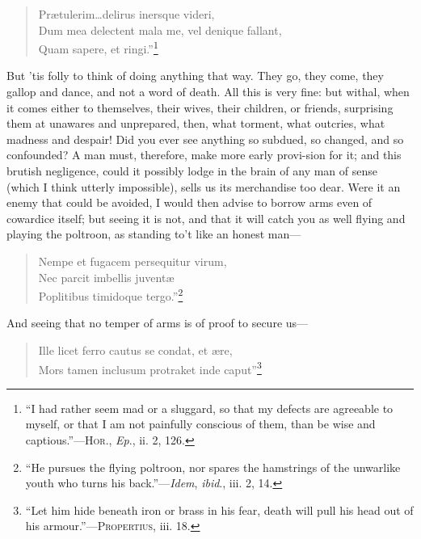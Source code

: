 \begin{verse}
Pr\ae tulerim\ldots delirus inersque videri,\\
Dum mea delectent mala me, vel denique fallant,\\
Quam sapere, et ringi.''\footnote{``I had rather seem mad or a sluggard,
so that my defects are agreeable to myself, or that I am not painfully
conscious of them, than be wise and captious.''---\textsc{Hor}.,
\textit{Ep}., ii. 2, 126.}
\end{verse}

\noindent But 'tis folly to think of doing anything that way. They go,
they come, they gallop and dance, and not a word of death. All this is
very fine: but withal, when it comes either to themselves, their
wives, their children, or friends, surprising them at unawares and
unprepared, then, what torment, what outcries, what madness and
despair! Did you ever see anything so subdued, so changed, and so
confounded? A man must, therefore, make more early provi-sion
for it; and this brutish negligence, could it possibly lodge in the
brain of any man of sense (which I think utterly impossible), sells us
its merchandise too dear. Were it an enemy that could be avoided, I
would then advise to borrow arms even of cowardice itself; but seeing
it is not, and that it will catch you as well flying and playing the
poltroon, as standing to't like an honest man---

\begin{verse}
Nempe et fugacem persequitur virum,\\
Nec parcit imbellis juvent\ae\\
\vin Poplitibus timidoque tergo.''\footnote{``He pursues the flying
poltroon, nor spares the hamstrings of the unwarlike youth who turns
his back.''---\textit{Idem}, \textit{ibid}., iii. 2, 14.}
\end{verse}

And seeing that no temper of arms is of proof to secure us---

\begin{verse}
Ille licet ferro cautus se condat, et \ae re,\\
\vin Mors tamen inclusum protraket inde caput''\footnote{``Let him
hide beneath iron or brass in his fear, death will pull his head out
of his armour.''---\textsc{Propertius}, iii. 18.}
\end{verse}

